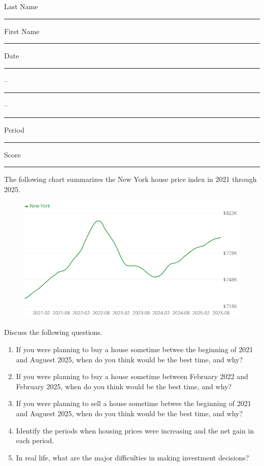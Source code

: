\documentclass[10pt]{article}
\title{}
\date{}
\begin{document}
\noindent
{
Last Name \rule{6em}{.1pt}First Name \rule{6em}{.1pt} Date \rule{1.5em}{.1pt} -- \rule{1.5em}{.1pt} -- \rule{1.5em}{.1pt} Period \rule{2em}{.1pt} Score \rule{2em}{.1pt}
}
\vspace{1em}

The following chart summarizes the New York house price index in 2021 through 2025.
\begin{figure}[h]
\centering
\includegraphics[width=.8\textwidth]{new-york-house-price-2021-2025.png}
\end{figure}
Discuss the following questions.
\begin{enumerate}
\item
If you were planning to buy a house sometime betwee the beginning of 2021 and Auguest 2025, when do you think would be the best time, and why?
\item
If you were planning to buy a house sometime between February 2022 and February 2025, when do you think would be the best time, and why?
\item 
If you were planning to sell a house sometime betwee the beginning of 2021 and Auguest 2025, when do you think would be the best time, and why?
\item
Identify the periods when housing prices were increasing and the net gain in each period.
\item
In real life, what are the major difficulties in making investment decisions?
\end{enumerate}
\end{document}
